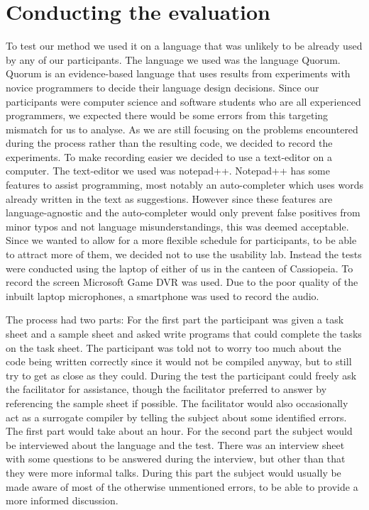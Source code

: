 \chapter{Conducting the evaluation}
To test our method we used it on a language that was unlikely to be already used by any of our participants.
The language we used was the language Quorum.
Quorum is an evidence-based language that uses results from experiments with novice programmers to decide their language design decisions.
Since our participants were computer science and software students who are all experienced programmers, we expected there would be some errors from this targeting mismatch for us to analyse.
As we are still focusing on the problems encountered during the process rather than the resulting code, we decided to record the experiments.
To make recording easier we decided to use a text-editor on a computer.
The text-editor we used was notepad++.
Notepad++ has some features to assist programming, most notably an auto-completer which uses words already written in the text as suggestions.
However since these features are language-agnostic and the auto-completer would only prevent false positives from minor typos and not language misunderstandings, this was deemed acceptable.%
Since we wanted to allow for a more flexible schedule for participants, to be able to attract more of them, we decided not to use the usability lab.
Instead the tests were conducted using the laptop of either of us in the canteen of Cassiopeia.
To record the screen Microsoft Game DVR was used.
Due to the poor quality of the inbuilt laptop microphones, a smartphone was used to record the audio.%

The process had two parts:
For the first part the participant was given a task sheet and a sample sheet and asked write programs that could complete the tasks on the task sheet.
The participant was told not to worry too much about the code being written correctly since it would not be compiled anyway, but to still try to get as close as they could.
During the test the participant could freely ask the facilitator for assistance, though the facilitator preferred to answer by referencing the sample sheet if possible.
The facilitator would also occasionally act as a surrogate compiler by telling the subject about some identified errors.%
The first part would take about an hour.
For the second part the subject would be interviewed about the language and the test.
There was an interview sheet with some questions to be answered during the interview, but other than that they were more informal talks.
During this part the subject would usually be made aware of most of the otherwise unmentioned errors, to be able to provide a more informed discussion.